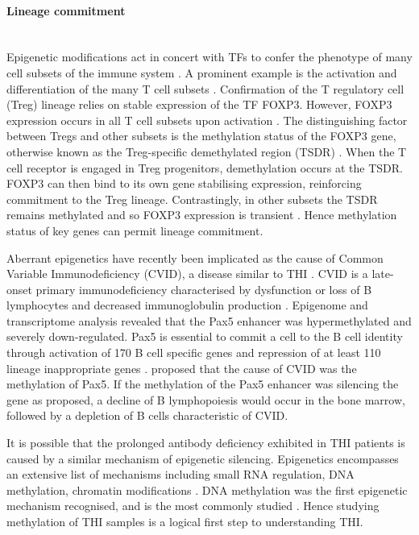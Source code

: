 \documentclass[12pt]{article}
\begin{document}
			
		\paragraph{Lineage commitment}
		~\\
			Epigenetic modifications act in concert with TFs to confer the phenotype of many cell subsets of the immune system \citep{Lara14,Zan15,Mercer11}. 
			A prominent example is the activation and differentiation of the many T cell subsets \citep{Begin14, Zeng13}. 
			Confirmation of the T regulatory cell (Treg) lineage relies on stable expression of the TF FOXP3.
			However, FOXP3 expression occurs in all T cell subsets upon activation \citep{Ohkura13,Polansky08}.
			The distinguishing factor between Tregs and other subsets is the methylation status of the FOXP3 gene, otherwise known as the Treg-specific demethylated region (TSDR) \cite{Shimazu16}.
			When the T cell receptor is engaged in Treg progenitors, demethylation occurs at the TSDR. 
			FOXP3 can then bind to its own gene stabilising expression, reinforcing commitment to the Treg lineage.
			Contrastingly, in other subsets the TSDR remains methylated and so FOXP3 expression is transient \citep{Ohkura13}.
			Hence methylation status of key genes can permit lineage commitment. 
			
			Aberrant epigenetics have recently been implicated as the cause of Common Variable Immunodeficiency (CVID), a disease similar to THI \citep{Tallmadge15}.
			CVID is a late-onset primary immunodeficiency characterised by dysfunction or loss of B lymphocytes and decreased immunoglobulin production \citep{Cunningham-Rundles12}.
			Epigenome and transcriptome analysis revealed that the Pax5 enhancer was hypermethylated and severely  down-regulated.
			Pax5 is essential to commit a cell to the B cell identity through activation of 170 B cell specific genes and repression of at least 110 lineage inappropriate genes \citep{Schebesta07,Delogu06,Roessler07}.
			\citet{Tallmadge15} proposed that the cause of CVID was the methylation of Pax5. 
			If the methylation of the Pax5 enhancer was silencing the gene as proposed, a decline of B lymphopoiesis would occur in the bone marrow, followed by a depletion of B cells characteristic of CVID.
			
			It is possible that the prolonged antibody deficiency exhibited in THI patients is caused by a similar mechanism of epigenetic silencing.
			Epigenetics encompasses an extensive list of mechanisms including small RNA regulation, DNA methylation, chromatin modifications \citep{Zan15,Bodak14,Eichten14,Li13}.
			DNA methylation was the first epigenetic mechanism recognised, and is the most commonly studied \citep{Begin14}.
			Hence studying methylation of THI samples is a logical first step to understanding THI.
		
\end{document}
